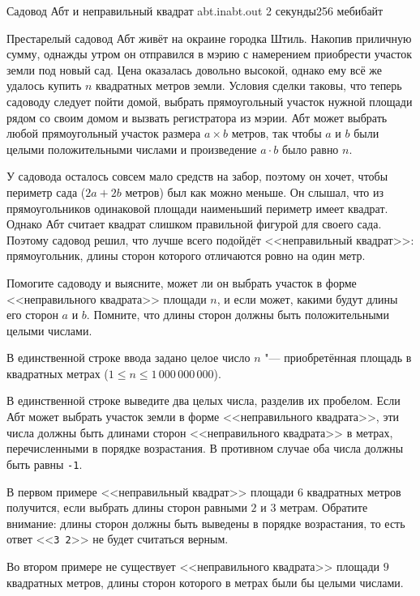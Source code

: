 \gdef\thisproblemauthor{Иван Казменко}
\gdef\thisproblemdeveloper{Иван Казменко}
\begin{problem}{Садовод Абт и неправильный квадрат}
{abt.in}{abt.out}
{2 секунды}{256 мебибайт}{}

Престарелый садовод Абт живёт на окраине городка Штиль.
Накопив приличную сумму, однажды утром он отправился в мэрию
с намерением приобрести участок земли под новый сад.
Цена оказалась довольно высокой, однако ему всё же удалось
купить $n$ квадратных метров земли.
Условия сделки таковы, что теперь садоводу следует пойти домой,
выбрать прямоугольный участок нужной площади рядом со своим домом
и вызвать регистратора из мэрии.
Абт может выбрать любой прямоугольный участок размера $a \times b$ метров,
так чтобы $a$ и $b$ были целыми положительными числами и произведение
$a \cdot b$ было равно $n$.

У садовода осталось совсем мало средств на забор, поэтому он хочет,
чтобы периметр сада ($2 a + 2 b$ метров) был как можно меньше.
Он слышал, что из прямоугольников одинаковой площади наименьший периметр
имеет квадрат.
Однако Абт считает квадрат слишком правильной фигурой для своего сада.
Поэтому садовод решил, что лучше всего подойдёт <<неправильный квадрат>>:
прямоугольник, длины сторон которого отличаются ровно на один метр.

Помогите садоводу и выясните, может ли он выбрать участок в форме
<<неправильного квадрата>> площади $n$, и если может, какими будут длины
его сторон $a$ и $b$.
Помните, что длины сторон должны быть положительными целыми числами.

\ifdefined\newpageafterlegend\newpage\fi

\InputFile

В единственной строке ввода задано целое число $n$ "--- приобретённая площадь
в квадратных метрах ($1 \le n \le 1\,000\,000\,000$).

\OutputFile

В единственной строке выведите два целых числа, разделив их пробелом.
Если Абт может выбрать участок земли в форме <<неправильного квадрата>>,
эти числа должны быть длинами сторон <<неправильного квадрата>> в метрах,
перечисленными в порядке возрастания.
В противном случае оба числа должны быть равны \texttt{-1}.

\Examples

\begin{example}
%
%
\end{example}

\Explanations

В первом примере <<неправильный квадрат>> площади $6$ квадратных метров
получится, если выбрать длины сторон равными $2$ и $3$ метрам.
Обратите внимание: длины сторон должны быть выведены в порядке
возрастания, то есть ответ <<\texttt{3 2}>> не будет считаться верным.

Во втором примере не существует <<неправильного квадрата>>
площади $9$ квадратных метров, длины сторон которого в метрах
были бы целыми числами.

\end{problem}
